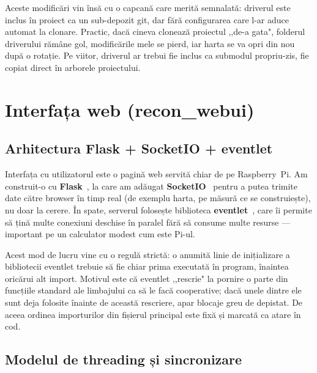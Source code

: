 \documentclass[a4paper,12pt,twoside,openany]{report}
\begin{document}
Aceste modificări vin însă cu o capcană care merită semnalată: driverul este
inclus în proiect ca un sub-depozit git, dar fără configurarea care l-ar aduce
automat la clonare. Practic, dacă cineva clonează proiectul ,,de-a gata",
folderul driverului rămâne gol, modificările mele se pierd, iar harta se va
opri din nou după o rotație. Pe viitor, driverul ar trebui fie inclus ca
submodul propriu-zis, fie copiat direct în arborele proiectului.

\clearpage

\chapter{Interfața web (recon\_webui)}
\label{cap:webui}

\section{Arhitectura Flask + SocketIO + eventlet}
\label{sec:flask-arch}

Interfața cu utilizatorul este o pagină web servită chiar de pe Raspberry~Pi.
Am construit-o cu \textbf{Flask}~\cite{flask}, la care am adăugat
\textbf{SocketIO}~\cite{flasksocketio, socketio} pentru a putea trimite date
către browser în timp real (de exemplu harta, pe măsură ce se construiește),
nu doar la cerere. În spate, serverul folosește biblioteca
\textbf{eventlet}~\cite{eventlet}, care îi permite să țină multe conexiuni
deschise în paralel fără să consume multe resurse — important pe un calculator
modest cum este Pi-ul.

Acest mod de lucru vine cu o regulă strictă: o anumită linie de inițializare a
bibliotecii eventlet trebuie să fie chiar prima executată în program, înaintea
oricărui alt import. Motivul este că eventlet ,,rescrie" la pornire o parte din
funcțiile standard ale limbajului ca să le facă cooperative; dacă unele dintre
ele sunt deja folosite înainte de această rescriere, apar blocaje greu de
depistat. De aceea ordinea importurilor din fișierul principal este fixă și
marcată ca atare în cod.

\section{Modelul de threading și sincronizare}
\label{sec:threading}
\end{document}
